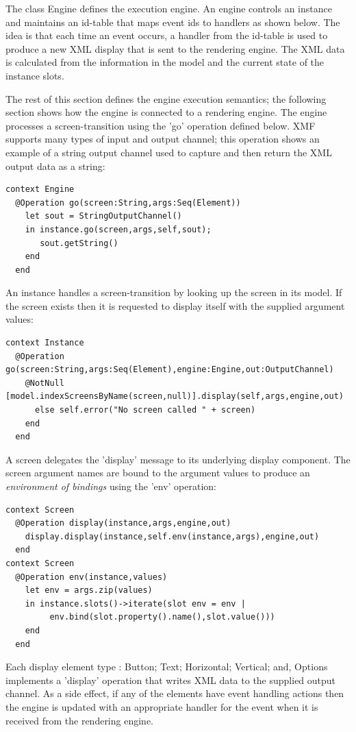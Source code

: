 The class Engine defines the execution engine. An engine controls
an instance and maintains an id-table that maps event ids to handlers
as shown below. The idea is that each time an event occurs, a handler
from the id-table is used to produce a new XML display that is sent
to the rendering engine. The XML data is calculated from the information
in the model and the current state of the instance slots.

The rest of this section defines the engine execution semantics; the
following section shows how the engine is connected to a rendering
engine. The engine processes a screen-transition using the 'go' operation
defined below. XMF supports many types of input and output channel;
this operation shows an example of a string output channel used to
capture and then return the XML output data as a string:

\begin{lstlisting}
context Engine
  @Operation go(screen:String,args:Seq(Element))
    let sout = StringOutputChannel()
    in instance.go(screen,args,self,sout);
       sout.getString()
    end
  end
\end{lstlisting}An instance handles a screen-transition by looking up the screen in
its model. If the screen exists then it is requested to display itself
with the supplied argument values:

\begin{lstlisting}
context Instance
  @Operation go(screen:String,args:Seq(Element),engine:Engine,out:OutputChannel)
    @NotNull [model.indexScreensByName(screen,null)].display(self,args,engine,out)
      else self.error("No screen called " + screen)
    end
  end
\end{lstlisting}A screen delegates the 'display' message to its underlying display
component. The screen argument names are bound to the argument values
to produce an \emph{environment of bindings} using the 'env' operation:

\begin{lstlisting}
context Screen
  @Operation display(instance,args,engine,out)
    display.display(instance,self.env(instance,args),engine,out)
  end
context Screen    
  @Operation env(instance,values)
    let env = args.zip(values)
    in instance.slots()->iterate(slot env = env | 
         env.bind(slot.property().name(),slot.value()))
    end
  end
\end{lstlisting}Each display element type : Button; Text; Horizontal; Vertical; and,
Options implements a 'display' operation that writes XML data to the
supplied output channel. As a side effect, if any of the elements
have event handling actions then the engine is updated with an appropriate
handler for the event when it is received from the rendering engine.

